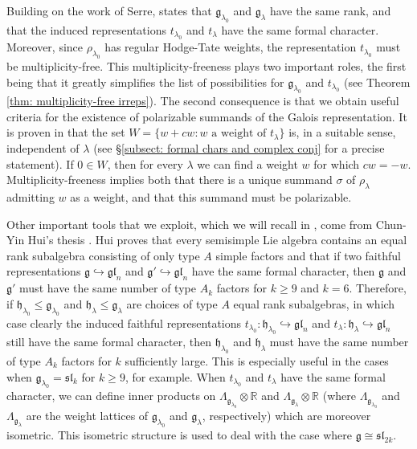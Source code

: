 \documentclass{amsart}
\theoremstyle{definition}
\numberwithin{equation}{section} %
\newcommand{\sllie}{\mathfrak{sl}}
\newcommand{\bb}[1]{\mathbb{#1}}
\newcommand{\mf}[1]{\mathfrak{#1}}
\begin{document}
Building on the work of Serre, \cite[Theorem 3.19]{hui2013monodromy} states that \( \mf{g}_{\lambda_0} \) and \( \mf{g}_{\lambda} \) have the same rank, and that the induced representations \( t_{\lambda_0} \) and \( t_{\lambda} \) have the same formal character. Moreover, since \( \rho_{\lambda_0} \) has regular Hodge-Tate weights, the representation \( t_{\lambda_0} \) must be multiplicity-free.
This multiplicity-freeness plays two important roles, the first being that it greatly simplifies the list of possibilities for $\mf{g}_{\lambda_0}$ and $t_{\lambda_0}$ (see Theorem \ref{thm: multiplicity-free irreps}).
The second consequence is that we obtain useful criteria for the existence of polarizable summands of the Galois representation.
It is proven in \cite{Xia19} that the set $W =\{w + cw: w \text{ a weight of } t_\lambda\}$ is, in a suitable sense, independent of $\lambda$ (see \S \ref{subsect: formal chars and complex conj} for a precise statement).
If $0 \in W$, then for every $\lambda$ we can find a weight $w$ for which $cw = -w$.
Multiplicity-freeness implies both that there is a unique summand $\sigma$ of $\rho_\lambda$ admitting $w$ as a weight, and that this summand must be polarizable.

Other important tools that we exploit, which we will recall in , come from Chun-Yin Hui's thesis \cite{hui2013monodromy}. Hui proves that every semisimple Lie algebra contains an equal rank subalgebra consisting of only type \( A \) simple factors and that if two faithful representations \( \mf{g}\hookrightarrow\mf{gl}_n \) and \( \mf{g}'\hookrightarrow\mf{gl}_n \) have the same formal character, then \( \mf{g} \) and \( \mf{g}' \) must have the same number of type \( A_k \) factors for \( k\geq 9 \) and \( k=6 \). Therefore, if \( \mf{h}_{\lambda_0}\leq\mf{g}_{\lambda_0} \) and \( \mf{h}_\lambda\leq\mf{g}_\lambda \) are choices of type \( A \) equal rank subalgebras, in which case clearly the induced faithful representations \( t_{\lambda_0}:\mf{h}_{\lambda_0}\hookrightarrow \mf{gl}_n \) and \( t_{\lambda}:\mf{h}_{\lambda}\hookrightarrow \mf{gl}_n \) still have the same formal character, then \( \mf{h}_{\lambda_0} \) and \( \mf{h}_\lambda \) must have the same number of type \( A_k \) factors for \( k \) sufficiently large. This is especially useful in the cases when \( \mf{g}_{\lambda_0}=\mf{sl}_k \) for \( k\geq 9 \), for example. When \( t_{\lambda_0} \) and \( t_\lambda \) have the same formal character, we can define inner products on \( \Lambda_{\mf{g}_{\lambda_0}}\otimes\bb{R} \) and \( \Lambda_{\mf{g}_{\lambda}}\otimes\bb{R} \) (where \( \Lambda_{\mf{g}_{\lambda_0}} \) and \( \Lambda_{\mf{g}_{\lambda}} \) are the weight lattices of \( \mf{g}_{\lambda_0} \) and \( \mf{g}_{\lambda} \), respectively) which are moreover isometric. This isometric structure is used to deal with the case where $\mf{g} \cong \sllie_{2k}$.
\end{document}
